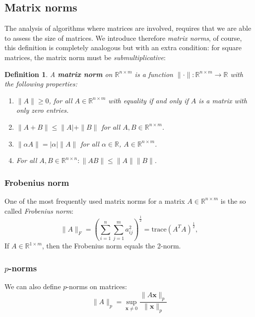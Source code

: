 \documentclass[a4paper,11pt]{report}
\newtheorem{definition}[theorem]{Definition}
\newcommand{\R}{{\mathbb R}}
\begin{document}
\subsection{Matrix norms}
The analysis of algorithms where matrices are involved, requires that we are able to assess the size of 
matrices. We introduce therefore \textit{matrix norms}, of course, this 
definition is completely analogous but with an extra condition: for square matrices, the matrix norm must 
be \emph{submultiplicative}: 
\begin{definition}\label{defmatrixnorms}
  A \textbf{matrix norm} on $\R^{n\times m}$ is a function $\|\cdot\|: \R^{n\times m} \to \R$ with 
  the following properties:
  \begin{enumerate}
 \item $\|A\| \geq 0$, for all $A \in \R^{n\times m}$ with equality if 
 and only if $A$ is a matrix with only zero entries.
 \item $\|A + B\| \leq \|A| + \|B\|$ for 
 all $A, B \in \R^{n\times m}$.
 \item $\|\alpha A\| = |\alpha|\|A\|$ for all $\alpha \in \R$, $A \in 
 \R^{n\times m}$.
 \item For all $A, B \in \R^{n\times n}: \|AB\|\leq \|A\|\|B\|.$
  \end{enumerate}
\end{definition}
\subsubsection{Frobenius norm}
One of the most frequently used matrix norms for a matrix $A \in \R^{n\times m}$ is the so called \textit{Frobenius norm}:
$$\|A\|_F = \left(\sum_{i=1}^n \sum_{j=1}^m a_{ij}^2\right)^{\frac{1}{2}} = \text{trace}(A^TA)^{\frac{1}{2}} ,$$
If $A \in \R^{1\times m}$, then the Frobenius norm equals the 2-norm.

\subsubsection{$p$-norms}
We can also define $p$-norms on matrices:
$$\|A\|_p = \sup_{\mathbf{x}\not = 0} \frac{\|A\mathbf{x}\|_p}{\|\mathbf{x}\|_p}$$
\end{document}
